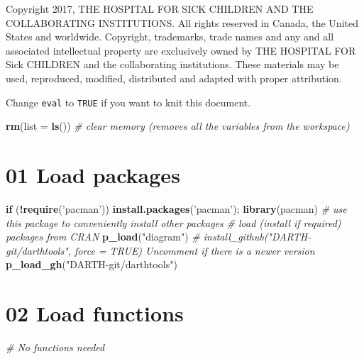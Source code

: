 \documentclass[
]{article}
\newenvironment{Shaded}{\begin{snugshade}}{\end{snugshade}}
\newcommand{\CommentTok}[1]{\textcolor[rgb]{0.56,0.35,0.01}{\textit{#1}}}
\newcommand{\ControlFlowTok}[1]{\textcolor[rgb]{0.13,0.29,0.53}{\textbf{#1}}}
\newcommand{\DataTypeTok}[1]{\textcolor[rgb]{0.13,0.29,0.53}{#1}}
\newcommand{\KeywordTok}[1]{\textcolor[rgb]{0.13,0.29,0.53}{\textbf{#1}}}
\newcommand{\NormalTok}[1]{#1}
\newcommand{\OperatorTok}[1]{\textcolor[rgb]{0.81,0.36,0.00}{\textbf{#1}}}
\newcommand{\StringTok}[1]{\textcolor[rgb]{0.31,0.60,0.02}{#1}}
\begin{document}
Copyright 2017, THE HOSPITAL FOR SICK CHILDREN AND THE COLLABORATING
INSTITUTIONS. All rights reserved in Canada, the United States and
worldwide. Copyright, trademarks, trade names and any and all associated
intellectual property are exclusively owned by THE HOSPITAL FOR Sick
CHILDREN and the collaborating institutions. These materials may be
used, reproduced, modified, distributed and adapted with proper
attribution.

\newpage

Change \texttt{eval} to \texttt{TRUE} if you want to knit this document.

\begin{Shaded}
\begin{Highlighting}[]
\KeywordTok{rm}\NormalTok{(}\DataTypeTok{list =} \KeywordTok{ls}\NormalTok{())      }\CommentTok{# clear memory (removes all the variables from the workspace)}
\end{Highlighting}
\end{Shaded}

\hypertarget{load-packages}{%
\section{01 Load packages}\label{load-packages}}

\begin{Shaded}
\begin{Highlighting}[]
\ControlFlowTok{if}\NormalTok{ (}\OperatorTok{!}\KeywordTok{require}\NormalTok{(}\StringTok{'pacman'}\NormalTok{)) }\KeywordTok{install.packages}\NormalTok{(}\StringTok{'pacman'}\NormalTok{); }\KeywordTok{library}\NormalTok{(pacman) }\CommentTok{# use this package to conveniently install other packages}
\CommentTok{# load (install if required) packages from CRAN}
\KeywordTok{p_load}\NormalTok{(}\StringTok{"diagram"}\NormalTok{) }
\CommentTok{# install_github("DARTH-git/darthtools", force = TRUE) Uncomment if there is a newer version}
\KeywordTok{p_load_gh}\NormalTok{(}\StringTok{"DARTH-git/darthtools"}\NormalTok{)}
\end{Highlighting}
\end{Shaded}

\hypertarget{load-functions}{%
\section{02 Load functions}\label{load-functions}}

\begin{Shaded}
\begin{Highlighting}[]
\CommentTok{# No functions needed}
\end{Highlighting}
\end{Shaded}
\end{document}
